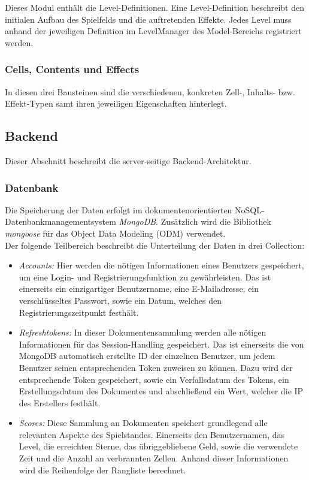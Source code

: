 \documentclass[letterpaper, 10 pt, conference]{ieeeconf}
\begin{document}
Dieses Modul enthält die Level-Definitionen.
Eine Level-Definition beschreibt den initialen Aufbau des Spielfelds und die auftretenden Effekte.
Jedes Level muss anhand der jeweiligen Definition im LevelManager des Model-Bereichs registriert werden.

\subsubsection{Cells, Contents und Effects}

In diesen drei Bausteinen sind die verschiedenen, konkreten Zell-, Inhalts- bzw. Effekt-Typen samt ihren jeweiligen Eigenschaften hinterlegt.

\subsection{Backend}
Dieser Abschnitt beschreibt die server-seitige Backend-Architektur.

\subsubsection{Datenbank} \label{datenbank}

Die Speicherung der Daten erfolgt im dokumentenorientierten NoSQL-Datenbankmanagementsystem \textit{MongoDB}.
Zusätzlich wird die Bibliothek  \textit{mongoose} für das Object Data Modeling (ODM) verwendet. \\
Der folgende Teilbereich beschreibt die Unterteilung der Daten in drei Collection:

\begin{itemize}
\item
\textit{Accounts:} Hier werden die nötigen Informationen eines Benutzers gespeichert, um
eine Login- und Registrierungsfunktion zu gewährleisten. Das ist einerseits ein
einzigartiger Benutzername, eine E-Mailadresse, ein verschlüsseltes Passwort, sowie
ein Datum, welches den Registrierungszeitpunkt festhält.
\item
\textit{Refreshtokens:} In dieser Dokumentensammlung werden alle nötigen Informationen für
das Session-Handling gespeichert. Das ist einerseits die von MongoDB automatisch
erstellte ID der einzelnen Benutzer, um jedem Benutzer seinen entsprechenden Token
zuweisen zu können. Dazu wird der entsprechende Token gespeichert, sowie ein Verfallsdatum
des Tokens, ein Erstellungsdatum des Dokumentes und abschließend ein Wert, welcher die
IP des Erstellers festhält.
\item
\textit{Scores:} Diese Sammlung an Dokumenten speichert grundlegend alle relevanten Aspekte des
Spielstandes. Einerseits den Benutzernamen, das Level, die erreichten Sterne, das
übriggebliebene Geld, sowie die verwendete Zeit und die Anzahl an verbrannten Zellen.
Anhand dieser Informationen wird die Reihenfolge der Rangliste berechnet.
\end{itemize}
\end{document}
